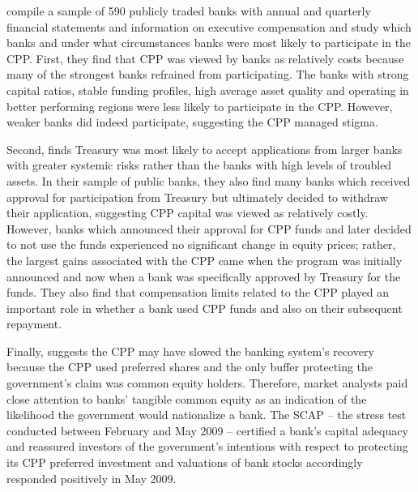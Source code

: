\documentclass[12pt]{article}
\begin{document}
\citet{Ba} compile a sample of 590 publicly traded banks with annual and quarterly financial statements and information on executive compensation and study which banks and under what circumstances banks were most likely to participate in the CPP. First, they find that CPP was viewed by banks as relatively costs because many of the strongest banks refrained from participating. The banks with strong capital ratios, stable funding profiles, high average asset quality and operating in better performing regions were less likely to participate in the CPP. However, weaker banks did indeed participate, suggesting the CPP managed stigma. 

Second, \citet{Ba} finds Treasury was most likely to accept applications from larger banks with greater systemic risks rather than the banks with high levels of troubled assets.  In their sample of public banks, they also find many banks which received approval for participation from Treasury but ultimately decided to withdraw their application, suggesting  CPP capital was viewed as relatively costly. However, banks which announced their approval for CPP funds and later decided to not use the funds experienced no significant change in equity prices; rather, the largest gains associated with the CPP came when the program was initially announced and now when a bank was specifically approved by Treasury for the funds. They also find that compensation limits related to the CPP played an important role in whether a bank used CPP funds and also on their subsequent repayment. 

Finally, \citet{Ba} suggests the CPP may have slowed the banking system's recovery because the CPP used preferred shares and the only buffer protecting the government's claim was common equity holders. Therefore, market analysts paid close attention to banks' tangible common equity as an indication of the likelihood the government would nationalize a bank. The SCAP -- the stress test conducted between February and May 2009 -- certified a bank's capital adequacy and reassured investors of the government's intentions with respect to protecting its CPP preferred investment and valuations of bank stocks accordingly responded positively in May 2009. 
\end{document}

